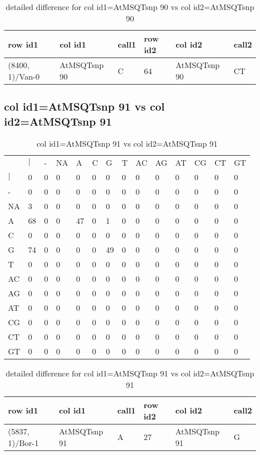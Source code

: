 \begin{center}
\begin{longtable}{|l|l|l|l|l|l|}
\caption{detailed difference for col id1=AtMSQTsnp 90 vs col id2=AtMSQTsnp 90} \label{table_dm777}\\
\hline
row id1&col id1&call1&row id2&col id2&call2\\
\hline
(8400, 1)/Van-0&AtMSQTsnp 90&C&64&AtMSQTsnp 90&CT\\
\hline
\end{longtable}
\end{center}

\subsection{col id1=AtMSQTsnp 91 vs col id2=AtMSQTsnp 91}
\begin{center}
\begin{longtable}{|l|l|l|l|l|l|l|l|l|l|l|l|l|l|}
\caption{col id1=AtMSQTsnp 91 vs col id2=AtMSQTsnp 91} \label{table_dm778}\\
\hline
\\
\hline
&$|$&-&NA&A&C&G&T&AC&AG&AT&CG&CT&GT\\
$|$&0&0&0&0&0&0&0&0&0&0&0&0&0\\
-&0&0&0&0&0&0&0&0&0&0&0&0&0\\
NA&3&0&0&0&0&0&0&0&0&0&0&0&0\\
A&68&0&0&47&0&1&0&0&0&0&0&0&0\\
C&0&0&0&0&0&0&0&0&0&0&0&0&0\\
G&74&0&0&0&0&49&0&0&0&0&0&0&0\\
T&0&0&0&0&0&0&0&0&0&0&0&0&0\\
AC&0&0&0&0&0&0&0&0&0&0&0&0&0\\
AG&0&0&0&0&0&0&0&0&0&0&0&0&0\\
AT&0&0&0&0&0&0&0&0&0&0&0&0&0\\
CG&0&0&0&0&0&0&0&0&0&0&0&0&0\\
CT&0&0&0&0&0&0&0&0&0&0&0&0&0\\
GT&0&0&0&0&0&0&0&0&0&0&0&0&0\\
\hline
\end{longtable}
\end{center}

\begin{center}
\begin{longtable}{|l|l|l|l|l|l|}
\caption{detailed difference for col id1=AtMSQTsnp 91 vs col id2=AtMSQTsnp 91} \label{table_dm779}\\
\hline
row id1&col id1&call1&row id2&col id2&call2\\
\hline
(5837, 1)/Bor-1&AtMSQTsnp 91&A&27&AtMSQTsnp 91&G\\
\hline
\end{longtable}
\end{center}

